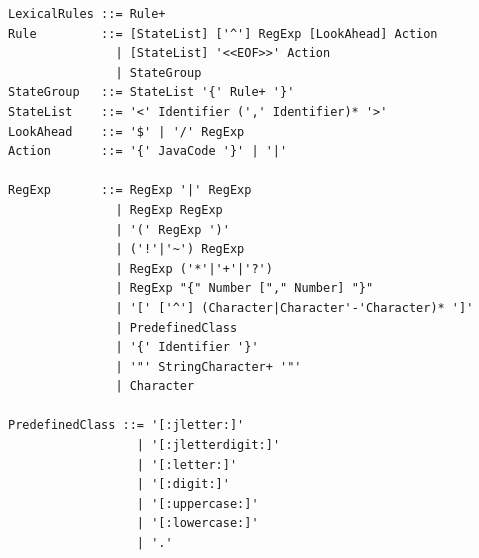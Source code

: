 \documentclass[11pt]{scrartcl}
\begin{document}
\begin{verbatim}
LexicalRules ::= Rule+ 
Rule         ::= [StateList] ['^'] RegExp [LookAhead] Action 
               | [StateList] '<<EOF>>' Action
               | StateGroup 
StateGroup   ::= StateList '{' Rule+ '}' 
StateList    ::= '<' Identifier (',' Identifier)* '>' 
LookAhead    ::= '$' | '/' RegExp
Action       ::= '{' JavaCode '}' | '|'

RegExp       ::= RegExp '|' RegExp 
               | RegExp RegExp 
               | '(' RegExp ')'
               | ('!'|'~') RegExp
               | RegExp ('*'|'+'|'?')
               | RegExp "{" Number ["," Number] "}" 
               | '[' ['^'] (Character|Character'-'Character)* ']' 
               | PredefinedClass 
               | '{' Identifier '}' 
               | '"' StringCharacter+ '"' 
               | Character 

PredefinedClass ::= '[:jletter:]' 
                  | '[:jletterdigit:]' 
                  | '[:letter:]' 
                  | '[:digit:]' 
                  | '[:uppercase:]' 
                  | '[:lowercase:]' 
                  | '.' 
\end{verbatim}
\end{document}
